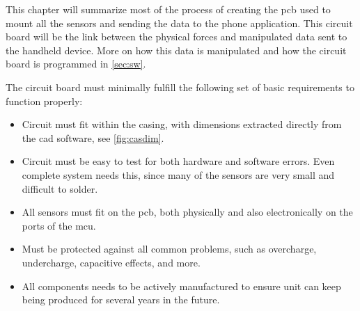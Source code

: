 This chapter will summarize most of the process of creating the \gls{pcb} used to mount all the sensors and sending the data to the phone application. This circuit board will be the link between the physical forces and manipulated data sent to the handheld device. More on how this data is manipulated and how the circuit board is programmed in \autoref{sec:sw}. 

The circuit board must minimally fulfill the following set of basic requirements to function properly:
\begin{itemize}[noitemsep]
\item Circuit must fit within the casing, with dimensions extracted directly from the cad software\cite{cad}, see \autoref{fig:casdim}.
\item Circuit must be easy to test for both hardware and software errors. Even complete system needs this, since many of the sensors are very small and difficult to solder.
\item All sensors must fit on the \gls{pcb}, both physically and also electronically on the ports of the \gls{mcu}.
\item Must be protected against all common problems, such as overcharge, undercharge, capacitive effects, and more.
\item All components needs to be actively manufactured to ensure unit can keep being produced for several years in the future.
\end{itemize}


